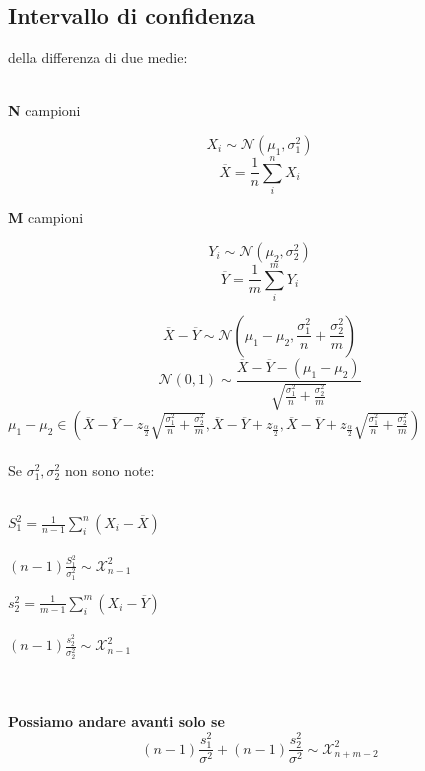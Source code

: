 \documentclass[]{article}
\begin{document}
    \subsection{Intervallo di confidenza}della differenza di due medie: \\ \\
    \begin{minipage}{0.5\textwidth}
        \centerline{\textbf{N} campioni}
        \[ X_i \sim \mathcal{N}(\mu_1, \sigma_1^2) \]
        \[ \overline{X} = \frac{1}{n} \sum_{i}^{n} X_i \]
    \end{minipage}
    \begin{minipage}{0.5\textwidth}
        \centerline{\textbf{M} campioni}
        \[ Y_i \sim \mathcal{N}(\mu_2, \sigma_2^2) \]
        \[ \overline{Y} = \frac{1}{m} \sum_{i}^{m} Y_i \]
    \end{minipage}
    \[ \overline{X} - \overline{Y} \sim \mathcal{N}\left ( \mu_1 - \mu_2, \frac{\sigma_1^2}{n} + \frac{\sigma_2^2}{m} \right ) \]
    \[ \mathcal{N}(0,1) \sim \frac{\overline{X} - \overline{Y} - (\mu_1 - \mu_2)}{\sqrt{\frac{\sigma_1^2}{n} + \frac{\sigma_2^2}{m}}} \]
    $\mu_1 - \mu_2 \in \left ( \overline{X} - \overline{Y} - z_{\frac{\alpha}{2}} \sqrt{\frac{\sigma_1^2}{n} + \frac{\sigma_2^2}{m}}, \overline{X} - \overline{Y} + z_{\frac{\alpha}{2}}, \overline{X} - \overline{Y} + z_{\frac{\alpha}{2}} \sqrt{\frac{\sigma_1^2}{n} + \frac{\sigma_2^2}{m}} \right )$ \\ \\
    Se $\sigma_1^2, \sigma_2^2$ non sono note: \\ \\
    \begin{minipage}{0.5\textwidth}
        $S_1^2 = \frac{1}{n-1} \sum_{i}^{n}(X_i - \overline{X})$ \\ \\
        $(n-1) \frac{S_1^2}{\sigma_1^2} \sim \mathcal{X}_{n-1}^2$
    \end{minipage}
    \begin{minipage}{0.5\textwidth}
        $s_2^2 = \frac{1}{m - 1} \sum_{i}^{m} (X_i - \overline{Y})$ \\ \\
        $(n-1) \frac{s_2^2}{\sigma_2^2} \sim \mathcal{X}_{n-1}^2$
    \end{minipage} \\ \\
    \textbf{Possiamo andare avanti solo se }
    \[ (n-1) \frac{s_1^2}{\sigma^2} + (n-1) \frac{s_2^2}{\sigma^2} \sim \mathcal{X}_{n+m-2}^2 \]
\end{document}
